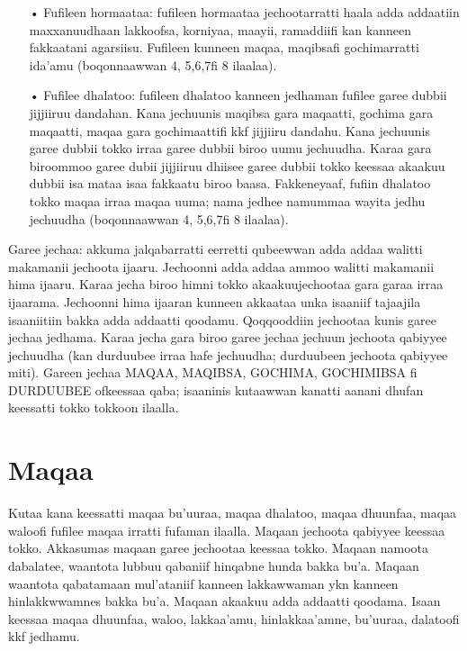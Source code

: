 \documentclass[11pt,b5paper]{book}
\begin{document}
\begin{itemize}
\begin{itemize}
\item[•] Fufileen hormaataa: fufileen hormaataa jechootarratti haala adda addaatiin maxxanuudhaan lakkoofsa, korniyaa, maayii, ramaddiifi kan kanneen fakkaatani agarsiisu. Fufileen kunneen maqaa, maqibsafi gochimarratti ida’amu (boqonnaawwan 4, 5,6,7fi 8 ilaalaa).

\item[•] Fufilee dhalatoo: fufileen dhalatoo kanneen jedhaman fufilee garee dubbii jijjiiruu dandahan. Kana jechuunis maqibsa gara maqaatti, gochima gara maqaatti, maqaa gara gochimaattifi kkf jijjiiru dandahu. Kana jechuunis garee dubbii tokko irraa garee dubbii biroo uumu jechuudha. Karaa gara biroommoo garee dubii jijjiiruu dhiisee garee dubbii tokko keessaa akaakuu dubbii isa mataa isaa fakkaatu biroo baasa. Fakkeneyaaf, fufiin dhalatoo tokko maqaa 
irraa maqaa uuma; nama jedhee namummaa wayita jedhu jechuudha (boqonnaawwan 4, 5,6,7fi 8 ilaalaa).
\end{itemize}

Garee jechaa: akkuma jalqabarratti eerretti qubeewwan adda addaa walitti makamanii jechoota ijaaru. Jechoonni adda addaa ammoo walitti makamanii hima ijaaru. Karaa jecha biroo himni tokko akaakuujechootaa gara garaa irraa ijaarama. Jechoonni hima ijaaran kunneen akkaataa unka isaaniif tajaajila isaaniitiin bakka adda addaatti qoodamu. Qoqqooddiin jechootaa kunis  garee jechaa jedhama. Karaa jecha gara biroo garee jechaa jechuun jechoota qabiyyee jechuudha (kan durduubee irraa hafe jechuudha; durduubeen jechoota qabiyyee miti). Gareen jechaa MAQAA, MAQIBSA, GOCHIMA, GOCHIMIBSA fi DURDUUBEE ofkeessaa qaba; isaaninis kutaawwan kanatti aanani dhufan keessatti tokko tokkoon ilaalla. 

\newpage
\section{Maqaa}

Kutaa kana keessatti maqaa bu'uuraa, maqaa dhalatoo, maqaa dhuunfaa, maqaa waloofi fufilee maqaa irratti fufaman ilaalla. Maqaan jechoota qabiyyee keessaa tokko. Akkasumas maqaan garee jechootaa keessaa tokko. Maqaan namoota dabalatee, waantota lubbuu qabaniif hinqabne hunda bakka bu'a. Maqaan waantota qabatamaan mul'ataniif kanneen lakkawwaman ykn kanneen hinlakkwwamnes bakka bu’a. Maqaan akaakuu adda addaatti qoodama. Isaan keessaa maqaa dhuunfaa, waloo, lakkaa’amu, hinlakkaa’amne, bu’uuraa, dalatoofi kkf jedhamu. 


\end{itemize}
\end{document}
